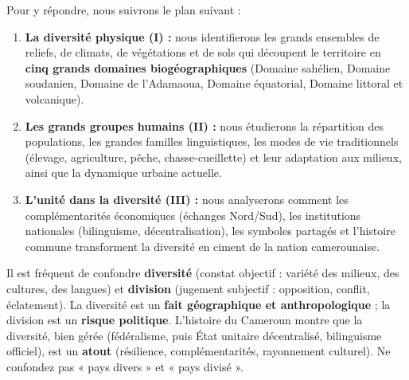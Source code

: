 \documentclass[11pt]{article}
\begin{document}
Pour y répondre, nous suivrons le plan suivant :

\begin{enumerate}
    \item \textbf{La diversité physique (I) :} nous identifierons les grands ensembles de reliefs, de climats, de végétations et de sols qui découpent le territoire en \textbf{cinq grands domaines biogéographiques} (Domaine sahélien, Domaine soudanien, Domaine de l'Adamaoua, Domaine équatorial, Domaine littoral et volcanique).
    \item \textbf{Les grands groupes humains (II) :} nous étudierons la répartition des populations, les grandes familles linguistiques, les modes de vie traditionnels (élevage, agriculture, pêche, chasse-cueillette) et leur adaptation aux milieux, ainsi que la dynamique urbaine actuelle.
    \item \textbf{L'unité dans la diversité (III) :} nous analyserons comment les complémentarités économiques (échanges Nord/Sud), les institutions nationales (bilinguisme, décentralisation), les symboles partagés et l'histoire commune transforment la diversité en ciment de la nation camerounaise.
\end{enumerate}

\begin{attention}
Il est fréquent de confondre \textbf{diversité} (constat objectif : variété des milieux, des cultures, des langues) et \textbf{division} (jugement subjectif : opposition, conflit, éclatement). La diversité est un \textbf{fait géographique et anthropologique} ; la division est un \textbf{risque politique}. L'histoire du Cameroun montre que la diversité, bien gérée (fédéralisme, puis État unitaire décentralisé, bilinguisme officiel), est un \textbf{atout} (résilience, complémentarités, rayonnement culturel). Ne confondez pas « pays divers » et « pays divisé ».
\end{attention}
\end{document}
